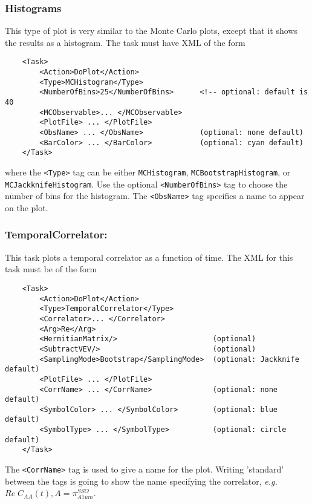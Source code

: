 \documentclass[12pt,notitlepage,letterpaper]{article}
\newcommand{\vb}{\texttt}
\begin{document}
\subsubsection{Histograms}
This type of plot is very similar to the Monte Carlo plots, except that it shows the results
as a histogram. The task must have XML of the form
\begin{verbatim}
    <Task>
        <Action>DoPlot</Action>
        <Type>MCHistogram</Type>
        <NumberOfBins>25</NumberOfBins>      <!-- optional: default is 40
        <MCObservable>... </MCObservable>
        <PlotFile> ... </PlotFile>
        <ObsName> ... </ObsName>             (optional: none default)
        <BarColor> ... </BarColor>           (optional: cyan default)
    </Task>
\end{verbatim}
where the \vb{<Type>} tag can be either \vb{MCHistogram}, \vb{MCBootstrapHistogram}, or
\vb{MCJackknifeHistogram}. Use the optional \vb{<NumberOfBins>} tag to
choose the number of bins for the histogram.
The \vb{<ObsName>} tag specifies a name to appear on the plot.

\subsubsection{TemporalCorrelator:}

This task plots a temporal correlator as a function of time. The XML for this task must be of the form
\begin{verbatim}
    <Task>
        <Action>DoPlot</Action>
        <Type>TemporalCorrelator</Type>
        <Correlator>... </Correlator>
        <Arg>Re</Arg>
        <HermitianMatrix/>                      (optional)
        <SubtractVEV/>                          (optional)
        <SamplingMode>Bootstrap</SamplingMode>  (optional: Jackknife default)
        <PlotFile> ... </PlotFile>
        <CorrName> ... </CorrName>              (optional: none default)
        <SymbolColor> ... </SymbolColor>        (optional: blue default)
        <SymbolType> ... </SymbolType>          (optional: circle default)
    </Task> 
\end{verbatim}
The \vb{<CorrName>} tag is used to give a name for the plot.
Writing 'standard' between the tags is going to show the name specifying the correlator, 
\textit{e.g.} $Re \; C_{AA}(t), A = \pi_{A1um}^{SSO}$.
\end{document}
